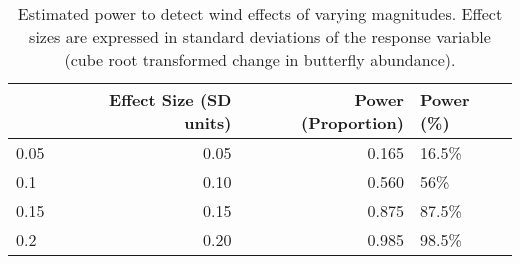 \begin{table}[htbp]
\centering
\caption{Estimated power to detect wind effects of varying magnitudes. Effect sizes are expressed in standard deviations of the response variable (cube root transformed change in butterfly abundance).}
\label{tab:power_analysis}
\begin{tabular}[t]{lrrl}
\toprule
  & Effect Size (SD units) & Power (Proportion) & Power (\%)\\
\midrule
0.05 & 0.05 & 0.165 & 16.5\%\\
0.1 & 0.10 & 0.560 & 56\%\\
0.15 & 0.15 & 0.875 & 87.5\%\\
0.2 & 0.20 & 0.985 & 98.5\%\\
\bottomrule
\end{tabular}
\end{table}
